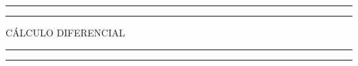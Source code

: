 \newcommand{\plogo}{\fbox{$\mathcal{PL}$}} %

\begin{titlepage} %

    \centering %

    \scshape %

    \vspace*{\baselineskip} %


    \rule{\textwidth}{1.6pt}\vspace*{-\baselineskip}\vspace*{2pt} %
    \rule{\textwidth}{0.4pt} %

    \vspace{0.75\baselineskip} %

    {\LARGE CÁLCULO DIFERENCIAL\\} %

    \vspace{0.75\baselineskip} %

    \rule{\textwidth}{0.4pt}\vspace*{-\baselineskip}\vspace{3.2pt} %
    \rule{\textwidth}{1.6pt} %

    \vspace{1\baselineskip} %



    \vspace*{1\baselineskip} %




    \vspace{1\baselineskip} %


\end{titlepage}
